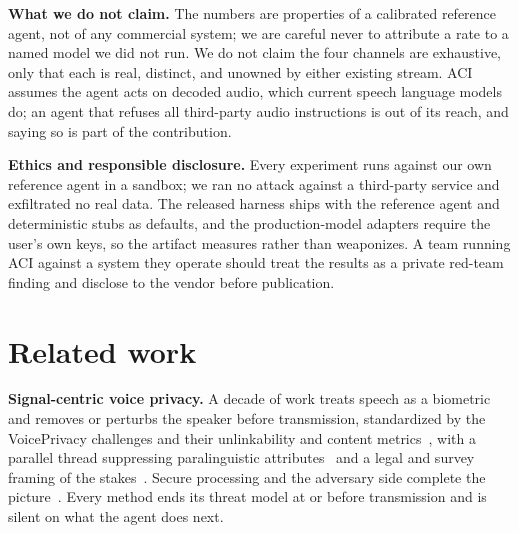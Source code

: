 \documentclass[a4paper]{article}
\newcommand{\aci}{\textsc{ACI}\xspace}
\begin{document}
\noindent\textbf{What we do not claim.} The numbers are properties of a calibrated reference agent, not of any commercial system; we are careful never to attribute a rate to a named model we did not run. We do not claim the four channels are exhaustive, only that each is real, distinct, and unowned by either existing stream. \aci assumes the agent acts on decoded audio, which current speech language models do; an agent that refuses all third-party audio instructions is out of its reach, and saying so is part of the contribution.

\noindent\textbf{Ethics and responsible disclosure.} Every experiment runs against our own reference agent in a sandbox; we ran no attack against a third-party service and exfiltrated no real data. The released harness ships with the reference agent and deterministic stubs as defaults, and the production-model adapters require the user's own keys, so the artifact measures rather than weaponizes. A team running \aci against a system they operate should treat the results as a private red-team finding and disclose to the vendor before publication.

\section{Related work}
\label{sec:related}
\noindent\textbf{Signal-centric voice privacy.} A decade of work treats speech as a biometric and removes or perturbs the speaker before transmission, standardized by the VoicePrivacy challenges and their unlinkability and content metrics~\cite{tomashenko2020initiative,tomashenko2022vp2020,tomashenko2024vp2022,fang2019xvector,srivastava2020design,srivastava2022xvector,champion2022disentangled,miao2023ohnn,meyer2022gan,patino2021mcadams,mawalim2022pitch,shamsabadi2023dpsa,maouche2022slicing}, with a parallel thread suppressing paralinguistic attributes~\cite{pathak2013privacy,jaiswal2020privacy,stoidis2021protecting} and a legal and survey framing of the stakes~\cite{nautsch2019csl,nautsch2019gdpr,srivastava2019reality}. Secure processing and the adversary side complete the picture~\cite{brasser2018voiceguard,qian2018infocom,han2020voiceindist,ahmed2020preech,deng2023vcloak,qian2018hidebehind,chen2021bob,li2020advpulse,vaidya2019talk}. Every method ends its threat model at or before transmission and is silent on what the agent does next.
\end{document}
